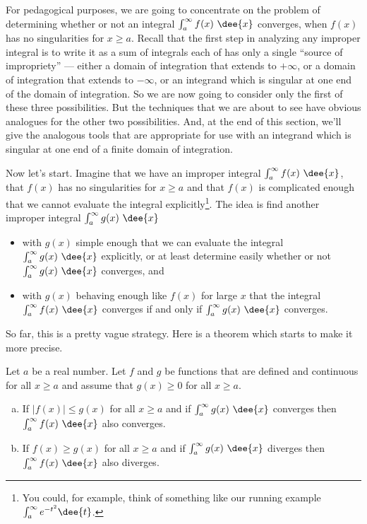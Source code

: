 \begin{remark}\label{rmk:singularities}
For pedagogical purposes, we are going to concentrate on the problem of
determining whether or not an integral $\int_a^\infty f(x)\ \dee{x}$ converges,
when $f(x)$ has no singularities for $x\ge a$. Recall that the first step in
analyzing any improper integral is to write it as a sum of integrals each of has
only a single ``source of impropriety'' --- either a domain of integration that
extends to $+\infty$, or a domain of integration that extends to $-\infty$, or
an integrand which is singular at one end of the domain of integration. So we
are now going to consider only the first of these three possibilities. But the
techniques that we are about to see have obvious analogues for the other two
possibilities. And, at the end of this section, we'll give the analogous tools 
that are appropriate for use with an integrand which is singular at one end 
of a finite domain of integration. 
\end{remark}

Now let's start. Imagine that we have an improper integral
$\int_a^\infty f(x)\ \dee{x}$, that $f(x)$ has no singularities for $x\ge a$
and that $f(x)$ is complicated enough that we cannot evaluate the
integral explicitly\footnote{You could, for example, think of something like
our running example $\int_a^\infty e^{-t^2}\dee{t}$.}. The idea is find another
improper integral $\int_a^\infty g(x)\ \dee{x}$
\begin{itemize}
\item with $g(x)$ simple enough that we can evaluate the integral
$\int_a^\infty g(x)\ \dee{x}$ explicitly, or at least determine easily
whether or not $\int_a^\infty g(x)\ \dee{x}$ converges, and
\item with $g(x)$ behaving enough like $f(x)$ for large $x$
that the integral $\int_a^\infty f(x)\ \dee{x}$ converges if and only if
$\int_a^\infty g(x)\ \dee{x}$ converges.
\end{itemize}
So far, this is a pretty vague strategy. Here is a theorem
which starts to make it more precise.


\begin{theorem}[Comparison]\label{thm:IMPcomparison}
Let $a$ be a real number. Let $f$ and $g$ be functions that are
defined and continuous for all $x\ge a$ and assume that  $g(x)\ge 0$
for all  $x\ge a$.
\begin{enumerate}[(a)]
\item If $|f(x)|\le g(x)$ for all $x\ge a$ and if $\int_a^\infty g(x)\ \dee{x}$
  converges then $\int_a^\infty f(x)\ \dee{x}$ also converges.
\item If $f(x)\ge g(x)$ for all $x\ge a$ and if $\int_a^\infty g(x)\ \dee{x}$
 diverges then $\int_a^\infty f(x)\ \dee{x}$ also diverges.
\end{enumerate}
\end{theorem}


